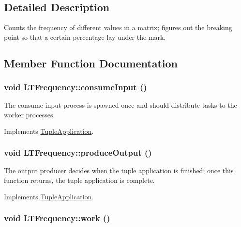 \subsection{Detailed Description}
Counts the frequency of different values in a matrix; figures out the breaking point so that a certain percentage lay under the mark. 

\subsection{Member Function Documentation}
\hypertarget{class_l_t_frequency_4ac4fa1a348246caf0d34506fcd09a64}{
\subsubsection[{consumeInput}]{\setlength{\rightskip}{0pt plus 5cm}void LTFrequency::consumeInput ()}}
\label{class_l_t_frequency_4ac4fa1a348246caf0d34506fcd09a64}


The consume input process is spawned once and should distribute tasks to the worker processes. 

Implements \hyperlink{class_tuple_application_e163c5a536de01c8b94b49528a17dab2}{TupleApplication}.\hypertarget{class_l_t_frequency_e80cd869c8935cb7fe553c6ad27e861b}{
\subsubsection[{produceOutput}]{\setlength{\rightskip}{0pt plus 5cm}void LTFrequency::produceOutput ()}}
\label{class_l_t_frequency_e80cd869c8935cb7fe553c6ad27e861b}


The output producer decides when the tuple application is finished; once this function returns, the tuple application is complete. 

Implements \hyperlink{class_tuple_application_8743dfcf17dedd52887c0b2ab170d8dc}{TupleApplication}.\hypertarget{class_l_t_frequency_7c47cf36b228505f79225a3fe8a00f01}{
\subsubsection[{work}]{\setlength{\rightskip}{0pt plus 5cm}void LTFrequency::work ()}}
\label{class_l_t_frequency_7c47cf36b228505f79225a3fe8a00f01}



